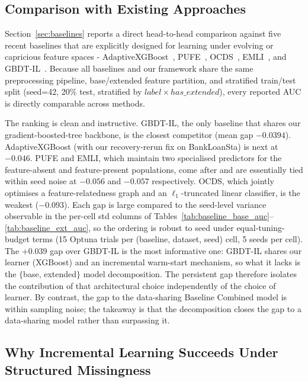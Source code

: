\documentclass[sigconf]{acmart}
\begin{document}
\begin{itemize}
\subsection{Comparison with Existing Approaches}

Section~\ref{sec:baselines} reports a direct head-to-head comparison against five recent baselines that are explicitly designed for learning under evolving or capricious feature spaces - AdaptiveXGBoost~\cite{montiel2020axgb}, PUFE~\cite{he2021pufe}, OCDS~\cite{he2019ocds}, EMLI~\cite{dong2021eml}, and GBDT-IL~\cite{chen2024gbdtil}. Because all baselines and our framework share the same preprocessing pipeline, base/extended feature partition, and stratified train/test split (seed=42, 20\% test, stratified by $label\times has\_extended$), every reported AUC is directly comparable across methods.

The ranking is clean and instructive. GBDT-IL, the only baseline that shares our gradient-boosted-tree backbone, is the closest competitor (mean gap $-0.0394$). AdaptiveXGBoost (with our recovery-rerun fix on BankLoanSta) is next at $-0.046$. PUFE and EMLI, which maintain two specialised predictors for the feature-absent and feature-present populations, come after and are essentially tied within seed noise at $-0.056$ and $-0.057$ respectively. OCDS, which jointly optimises a feature-relatedness graph and an $\ell_1$-truncated linear classifier, is the weakest ($-0.093$). Each gap is large compared to the seed-level variance observable in the per-cell std columns of Tables~\ref{tab:baseline_base_auc}--\ref{tab:baseline_ext_auc}, so the ordering is robust to seed under equal-tuning-budget terms (15 Optuna trials per (baseline, dataset, seed) cell, 5 seeds per cell). The $+0.039$ gap over GBDT-IL is the most informative one: GBDT-IL shares our learner (XGBoost) and an incremental warm-start mechanism, so what it lacks is the $\{$base, extended$\}$ model decomposition. The persistent gap therefore isolates the contribution of that architectural choice independently of the choice of learner. By contrast, the gap to the data-sharing Baseline Combined model is within sampling noise; the takeaway is that the decomposition closes the gap to a data-sharing model rather than surpassing it.

\subsection{Why Incremental Learning Succeeds Under Structured Missingness}


\end{itemize}
\end{document}
